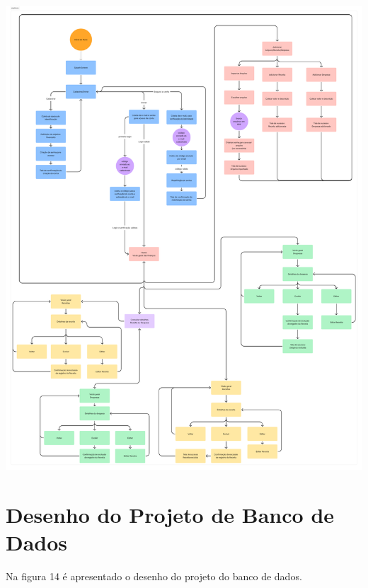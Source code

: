     \vspace{\baselineskip}
    \begin{center}
        \begin{minipage}{\textwidth}
            \centering
            \includegraphics[scale=0.08]{figs/figura13.png}
            \label{fig:figura13}
        \end{minipage}
    \end{center}

\section{Desenho do Projeto de Banco de Dados}

Na figura 14 é apresentado o desenho do projeto do banco de dados.

